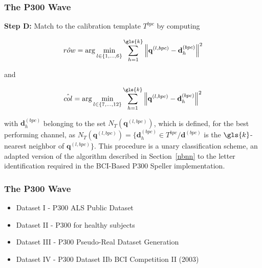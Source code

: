 \documentclass[aspectratio=169]{beamer}
\begin{document}
\begin{frame}
\frametitle{The P300 Wave}
\begin{center}
\textbf{Step D:} Match to the calibration template $T^{bpc}$ by computing  

\begin{equation}
\hat{row} = \arg \min_{l \in \{1,\dots,6\}} \sum_{h=1}^{\gls{k}}  {\left\lVert \mathbf{q}^{(l,bpc)} -  \mathbf{d}_{h}^{(bpc)} \right\rVert}  ^{2}
\label{eq:multiclassificationrow}
\end{equation}

\noindent and

\begin{equation}
\hat{col} = \arg \min_{l \in \{7,\dots,12\}} \sum_{h=1}^{\gls{k}}  {\left\lVert \mathbf{q}^{(l,bpc)} -  \mathbf{d}_{h}^{(bpc)} \right\rVert}  ^{2}
\label{eq:multiclassificationcol}
\end{equation}

\noindent with $\mathbf{d}_{h}^{(bpc)}$ belonging to the set $N_T( \mathbf{q}^{(l,bpc)}  )$, which is defined, for the best performing channel,  as $N_T(\mathbf{q}^{(l,bpc)} ) = \{ \mathbf{d}_{h}^{(bpc)} \in T^{bpc} /  \mathbf{d}^{(bpc)} $  is the $\gls{k}$-nearest neighbor of $ \mathbf{q}^{(l,bpc)} \}$.  This procedure is a unary classification scheme, an adapted version of the algorithm described in Section~\ref{nbnn} to the letter identification required in the BCI-Based P300 Speller implementation.
\end{center}
\end{frame}   


\begin{frame}
\frametitle{The P300 Wave}
\begin{center}
\begin{itemize}
 \item<1-> Dataset I - P300 ALS Public Dataset
 \item<2-> Dataset II - P300 for healthy subjects
 \item<3-> Dataset III - P300 Pseudo-Real Dataset Generation
 \item<4-> Dataset IV - P300 Dataset IIb BCI Competition II (2003)
\end{itemize}
\end{center}
\end{frame} 
\end{document}
